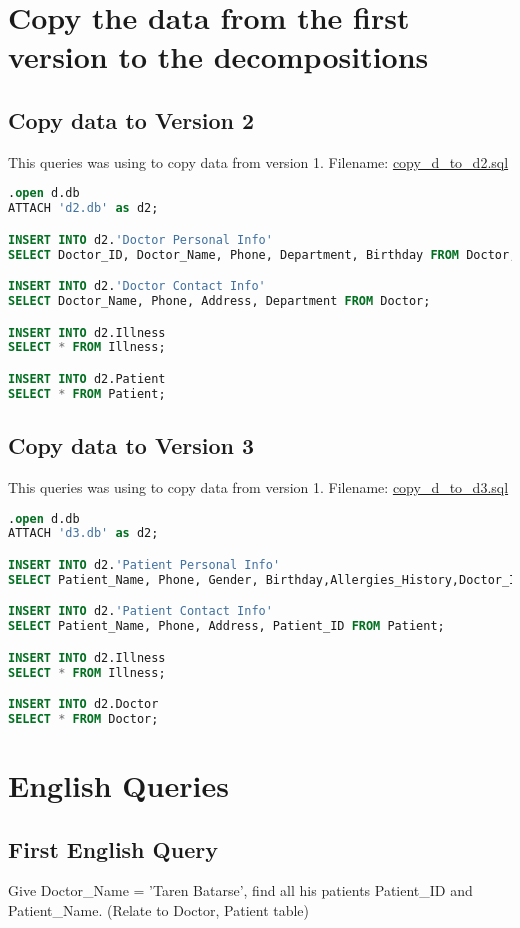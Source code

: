 \documentclass[12pt,arial]{article}
\begin{document}
\section{Copy the data from the first version to the decompositions}
\subsection{Copy data to Version 2}
This queries was using to copy data from version 1.
Filename: \url{copy_d_to_d2.sql}
\begin{lstlisting}[language=SQL]
.open d.db
ATTACH 'd2.db' as d2;

INSERT INTO d2.'Doctor Personal Info'
SELECT Doctor_ID, Doctor_Name, Phone, Department, Birthday FROM Doctor;

INSERT INTO d2.'Doctor Contact Info'
SELECT Doctor_Name, Phone, Address, Department FROM Doctor;

INSERT INTO d2.Illness
SELECT * FROM Illness;

INSERT INTO d2.Patient
SELECT * FROM Patient;
\end{lstlisting}
\subsection{Copy data to Version 3}
This queries was using to copy data from version 1.
Filename: \url{copy_d_to_d3.sql}
\begin{lstlisting}[language=SQL]
.open d.db
ATTACH 'd3.db' as d2;

INSERT INTO d2.'Patient Personal Info'
SELECT Patient_Name, Phone, Gender, Birthday,Allergies_History,Doctor_ID,Illness_ID FROM Patient;

INSERT INTO d2.'Patient Contact Info'
SELECT Patient_Name, Phone, Address, Patient_ID FROM Patient;

INSERT INTO d2.Illness
SELECT * FROM Illness;

INSERT INTO d2.Doctor
SELECT * FROM Doctor;
\end{lstlisting}

\section{English Queries}
\subsection{First English Query}
Give Doctor\_Name = 'Taren Batarse', find all his patients Patient\_ID and Patient\_Name.
(Relate to Doctor, Patient table)
\end{document}
